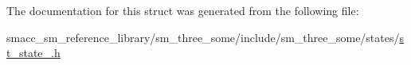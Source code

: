 The documentation for this struct was generated from the following file\+:\begin{DoxyCompactItemize}
\item 
smacc\+\_\+sm\+\_\+reference\+\_\+library/sm\+\_\+three\+\_\+some/include/sm\+\_\+three\+\_\+some/states/\hyperlink{sm__three__some_2include_2sm__three__some_2states_2st__state__1_8h}{st\+\_\+state\+\_.\+h}\end{DoxyCompactItemize}
